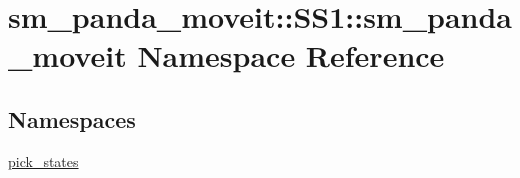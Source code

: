\hypertarget{namespacesm__panda__moveit_1_1SS1_1_1sm__panda__moveit}{}\section{sm\+\_\+panda\+\_\+moveit\+:\+:S\+S1\+:\+:sm\+\_\+panda\+\_\+moveit Namespace Reference}
\label{namespacesm__panda__moveit_1_1SS1_1_1sm__panda__moveit}
\subsection*{Namespaces}
\begin{DoxyCompactItemize}
\item 
 \hyperlink{namespacesm__panda__moveit_1_1SS1_1_1sm__panda__moveit_1_1pick__states}{pick\+\_\+states}
\end{DoxyCompactItemize}
